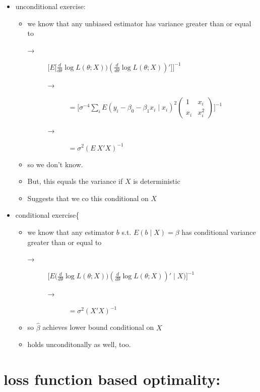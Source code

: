\begin{itemize}
\begin{itemize}
\begin{itemize}
\item unconditional exercise:
\begin{itemize}
\item we know that any unbiased estimator has variance greater than or equal to
\begin{description}
\item[→] $\Big[E \Big[\tfrac{d}{d\theta} \log L(\theta; X)) (\tfrac{d}{d\theta} \log L(\theta; X))'\Big]\Big]^{-1}$
\begin{description}
\item[→] $=\Big[\sigma^{-4} \sum_i E (y_i - \beta_0 - \beta_1 x_i \mid x_i)^2 \begin{pmatrix} 1 & x_i \\ x_i & x_i^2 \end{pmatrix}\Big]^{-1}$
\item[→] $= \sigma^2 (E\ X'X)^{-1}$
\end{description}
\end{description}
\item so we don't know.
\item But, this equals the variance if $X$ is deterministic
\item Suggests that we co this conditional on $X$
\end{itemize}
\item conditional exercise\{
\begin{itemize}
\item we know that any estimator $b$ s.t. $E(b \mid X) = \beta$ has conditional variance greater than or equal to
\begin{description}
\item[→] $\Big[E\Big(\tfrac{d}{d\theta} \log L(\theta; X)) (\tfrac{d}{d\theta} \log L(\theta; X))' \mid X\Big)\Big]^{-1}$
\begin{description}
\item[→] $= \sigma^2 (X'X)^{-1}$
\end{description}
\end{description}
\item so $\hat\beta$ achieves lower bound conditional on $X$
\item holds unconditonally as well, too.
\end{itemize}
\end{itemize}
\end{itemize}
\end{itemize}
\section{loss function based optimality:}
\label{sec-4}

